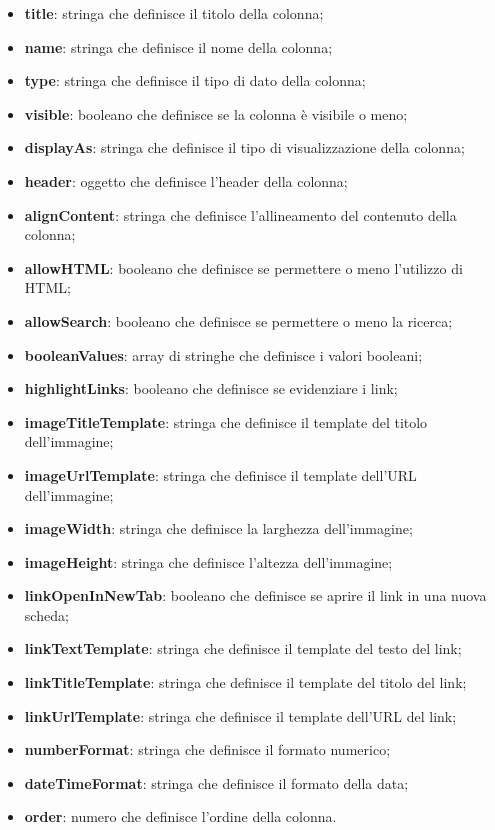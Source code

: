 \begin{itemize}
      \item \textbf{title}: stringa che definisce il titolo della colonna;
      \item \textbf{name}: stringa che definisce il nome della colonna;
      \item \textbf{type}: stringa che definisce il tipo di dato della colonna;
      \item \textbf{visible}: booleano che definisce se la colonna è visibile o meno;
      \item \textbf{displayAs}: stringa che definisce il tipo di visualizzazione della colonna;
      \item \textbf{header}: oggetto che definisce l'header della colonna;
      \item \textbf{alignContent}: stringa che definisce l'allineamento del contenuto della colonna;
      \item \textbf{allowHTML}: booleano che definisce se permettere o meno l'utilizzo di HTML;
      \item \textbf{allowSearch}: booleano che definisce se permettere o meno la ricerca;
      \item \textbf{booleanValues}: array di stringhe che definisce i valori booleani;
      \item \textbf{highlightLinks}: booleano che definisce se evidenziare i link;
      \item \textbf{imageTitleTemplate}: stringa che definisce il template del titolo dell'immagine;
      \item \textbf{imageUrlTemplate}: stringa che definisce il template dell'URL dell'immagine;
      \item \textbf{imageWidth}: stringa che definisce la larghezza dell'immagine;
      \item \textbf{imageHeight}: stringa che definisce l'altezza dell'immagine;
      \item \textbf{linkOpenInNewTab}: booleano che definisce se aprire il link in una nuova scheda;
      \item \textbf{linkTextTemplate}: stringa che definisce il template del testo del link;
      \item \textbf{linkTitleTemplate}: stringa che definisce il template del titolo del link;
      \item \textbf{linkUrlTemplate}: stringa che definisce il template dell'URL del link;
      \item \textbf{numberFormat}: stringa che definisce il formato numerico;
      \item \textbf{dateTimeFormat}: stringa che definisce il formato della data;
      \item \textbf{order}: numero che definisce l'ordine della colonna.
\end{itemize}

